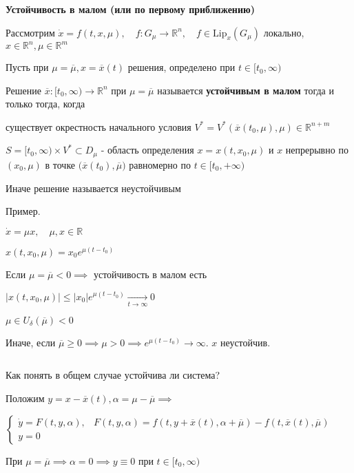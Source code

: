 \documentclass[12pt, a4paper]{article}
\begin{document}
  \textbf{Устойчивость в малом (или по первому приближению)}

  Рассмотрим 
  $\dot x = f(t, x, \mu), \quad f:G_\mu \to \mathbb{R}^n, \quad f\in \text{Lip}_x(G_\mu)$ локально, $x \in \mathbb{R}^n, \mu \in \mathbb{R}^m$

  Пусть при $\mu = \overline{\mu}, x= \overline{x}(t)$ решения, определено при $t \in  [t_0, \infty)$

  Решение $\overline{x}: [t_0, \infty) \to \mathbb{R}^n$ при $\mu = \overline{\mu}$ называется \textbf{устойчивым в малом} тогда и только тогда, когда 
  
  существует окрестность начального условия $V^* = V^*(\overline{x}(t_0, \mu), \mu) \in \mathbb{R}^{n+m}$

  $S = [t_0, \infty) \times V^* \subset D_\mu$ - область определения $x = x(t, x_0, \mu)$ и $x$ непрерывно по $(x_0, \mu)$ в точке $\big(\overline{x}(t_0), \overline{\mu}\big)$ равномерно по $t \in [t_0, + \infty)$
  
  Иначе решение называется неустойчивым

  Пример. 

  $\dot x = \mu x, \quad \mu, x \in \mathbb{R}$

  $x(t, x_0, \mu) = x_0 e^{\mu (t-t_0)}$

  Если $\mu = \overline{\mu} < 0 \implies $ устойчивость в малом есть

  $| x(t, x_0, \mu) | \le |x_0| e^{\mu(t-t_0)} \underset{t\to\infty}{\longrightarrow} 0$

  $\mu \in U_\delta(\overline{\mu}) < 0$

  Иначе, если $\overline{\mu} \ge 0 \implies \mu > 0 \implies e^{\mu(t-t_0)} \to \infty$. $x$ неустойчив.

  \par $ $

  Как понять в общем случае устойчива ли система?

  Положим $y = x- \overline{x}(t), \alpha = \mu - \overline{\mu} \implies $

  $\begin{cases}
    \dot y = F(t, y, \alpha), & F(t, y, \alpha) = f(t, y + \overline{x}(t), \alpha + \overline{\mu}) - f(t, \overline{x}(t), \overline{ \mu}) \\ y = 0
  \end{cases}$

  При $\mu = \overline \mu \implies \alpha = 0 \implies y \equiv 0$ при $t \in [t_0, \infty)$
\end{document}
